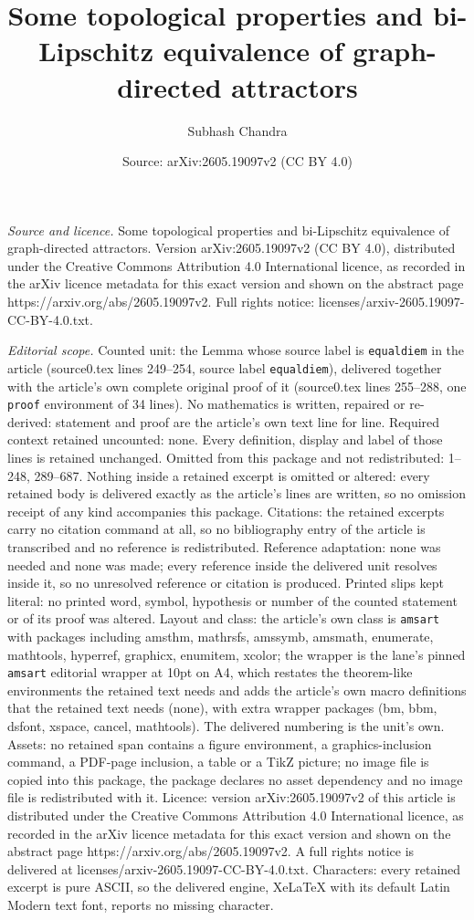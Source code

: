 \documentclass[10pt,a4paper]{amsart}
\title[Some topological properties and bi-Lipschitz equivalence of ]{Some topological properties and bi-Lipschitz equivalence of graph-directed attractors}
\author{Subhash Chandra}
\date{Source: arXiv:2605.19097v2 (CC BY 4.0)}
\begin{document}
\maketitle

\noindent\emph{Source and licence.} Some topological properties and bi-Lipschitz equivalence of graph-directed attractors. Version arXiv:2605.19097v2 (CC BY 4.0), distributed under the Creative Commons Attribution 4.0 International licence, as recorded in the arXiv licence metadata for this exact version and shown on the abstract page https://arxiv.org/abs/2605.19097v2. Full rights notice: licenses/arxiv-2605.19097-CC-BY-4.0.txt.\par\smallskip

\noindent\textit{Editorial scope.} Counted unit: the Lemma whose source label is \texttt{equaldiem} in the article (source0.tex lines 249--254, source label \texttt{equaldiem}), delivered together with the article's own complete original proof of it (source0.tex lines 255--288, one \texttt{proof} environment of 34 lines). No mathematics is written, repaired or re-derived: statement and proof are the article's own text line for line. Required context retained uncounted: none. Every definition, display and label of those lines is retained unchanged. Omitted from this package and not redistributed: 1--248, 289--687. Nothing inside a retained excerpt is omitted or altered: every retained body is delivered exactly as the article's lines are written, so no omission receipt of any kind accompanies this package. Citations: the retained excerpts carry no citation command at all, so no bibliography entry of the article is transcribed and no reference is redistributed. Reference adaptation: none was needed and none was made; every reference inside the delivered unit resolves inside it, so no unresolved reference or citation is produced. Printed slips kept literal: no printed word, symbol, hypothesis or number of the counted statement or of its proof was altered. Layout and class: the article's own class is \texttt{amsart} with packages including amsthm, mathrsfs, amssymb, amsmath, enumerate, mathtools, hyperref, graphicx, enumitem, xcolor; the wrapper is the lane's pinned \texttt{amsart} editorial wrapper at 10pt on A4, which restates the theorem-like environments the retained text needs and adds the article's own macro definitions that the retained text needs (none), with extra wrapper packages (bm, bbm, dsfont, xspace, cancel, mathtools). The delivered numbering is the unit's own. Assets: no retained span contains a figure environment, a graphics-inclusion command, a PDF-page inclusion, a table or a TikZ picture; no image file is copied into this package, the package declares no asset dependency and no image file is redistributed with it. Licence: version arXiv:2605.19097v2 of this article is distributed under the Creative Commons Attribution 4.0 International licence, as recorded in the arXiv licence metadata for this exact version and shown on the abstract page https://arxiv.org/abs/2605.19097v2. A full rights notice is delivered at licenses/arxiv-2605.19097-CC-BY-4.0.txt. Characters: every retained excerpt is pure ASCII, so the delivered engine, XeLaTeX with its default Latin Modern text font, reports no missing character.
\end{document}
